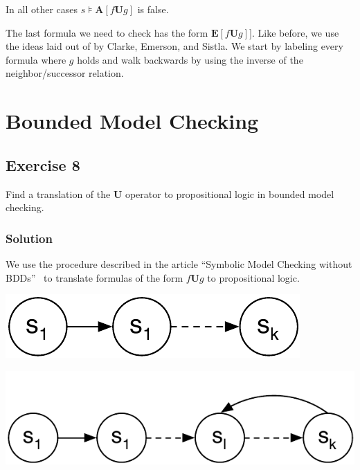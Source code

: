 \documentclass[a4paper, 12pt]{article}
\newcommand{\codeinput}[1]
{
    \begin{leftbar}
        {\fontsize{9pt}{11pt}}
    \end{leftbar}
}
\begin{document}
In all other cases $s⊧\mathbf{A}[f \mathbf{U} g]$ is false.

\codeinput{au}

The last formula we need to check has the form $\mathbf{E}[f \mathbf{U} g]]$.
Like before, we use the ideas laid out of by Clarke, Emerson, and Sistla. We
start by labeling every formula where $g$ holds and walk backwards by using
the inverse of the neighbor/successor relation.

\codeinput{label_EU}

\section{Bounded Model Checking}

\subsection{Exercise 8}

Find a translation of the $\mathbf{U}$ operator to propositional logic in
bounded model checking.

\subsubsection{Solution}

We use the procedure described in the article “Symbolic Model Checking without
BDDs”~\cite{Biere1999SymbolicModelChecking} to translate formulas of the form
$f\mathbf{U}g$ to propositional logic.

\begin{minipage}[t]{0.45\textwidth}
    \centering
    \vspace{0.7cm}
    \includegraphics[width=.72\textwidth]{Figures/Computation Path Without Loop}
    \label{figure:Figures_Computation_Path_Without_Loop}
\end{minipage}
\begin{minipage}[t]{0.45\textwidth}
    \centering
    \includegraphics[width=\textwidth]{Figures/Computation Path With Loop.pdf}
    \label{figure:Figures_Computation_Path_With_Loop}
\end{minipage}
\end{document}
